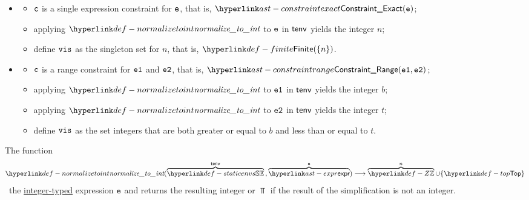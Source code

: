 \ProseParagraph
\OneApplies
\begin{itemize}
  \item {}
  \begin{itemize}
    \item $\texttt{c}$ is a single expression constraint for $\texttt{e}$, that is, $\ConstraintExact(\ve)$;
    \item applying $\normalizetoint$ to $\texttt{e}$ in $\textsf{tenv}$ yields the integer $n$\ProseTerminateAs{\Top};
    \item define $\texttt{vis}$ as the singleton set for $n$, that is, $\Finite(\{n\})$.
  \end{itemize}

  \item {}
  \begin{itemize}
    \item $\texttt{c}$ is a range constraint for $\texttt{e1}$ and $\texttt{e2}$, that is, $\ConstraintRange(\veone, \vetwo)$;
    \item applying $\normalizetoint$ to $\texttt{e1}$ in $\textsf{tenv}$ yields the integer $b$\ProseTerminateAs{\Top};
    \item applying $\normalizetoint$ to $\texttt{e2}$ in $\textsf{tenv}$ yields the integer $t$\ProseTerminateAs{\Top};
    \item define $\texttt{vis}$ as the set integers that are both greater or equal to $b$ and less than or equal to $t$.
  \end{itemize}
\end{itemize}

\FormallyParagraph
{}

\hypertarget{def-normalizetoint}{}
The function
\[
\normalizetoint(
  \overname{\staticenvs}{\tenv} \aslsep
  \overname{\expr}{\ve}
) \aslto \overname{\Z}{n} \cup \{\Top\}
\]
\symbolicallysimplifies\ the \underline{integer-typed} expression $\texttt{e}$ and returns the resulting integer or $\Top$ if
the result of the simplification is not an integer.

